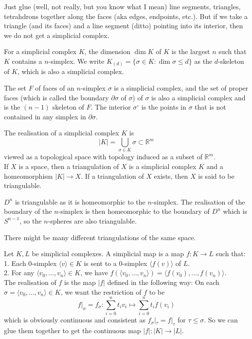 \begin{example}
    Just glue (well, not really, but you know what I mean) line segments, triangles, tetrahdrons together along the faces (aka edges, endpoints, etc.).
    But if we take a triangle (and its faces) and a line segment (ditto) pointing into its interior, then we do not get a simplicial complex.
\end{example}
\begin{definition}
    For a simplicial complex $K$, the dimension $\dim K$ of $K$ is the largest $n$ such that $K$ contains a $n$-simplex.
    We write $K_{(d)}=\{\sigma\in K:\dim\sigma\le d\}$ as the $d$-skeleton of $K$, which is also a simplicial complex.
\end{definition}
\begin{example}
    The set $F$ of faces of an $n$-simplex $\sigma$ is a simplicial complex, and the set of proper faces (which is called the boundary $\partial\sigma$ of $\sigma$) of $\sigma$ is also a simplicial complex and is the $(n-1)$ skeleton of $F$.
    The interior $\sigma^\circ$ is the points in $\sigma$ that is not contained in any simplex in $\partial\sigma$.
\end{example}
\begin{definition}
    The realisation of a simplicial complex $K$ is
    $$|K|=\bigcup_{\sigma\in K}\sigma\subset\mathbb R^m$$
    viewed as a topological space with topology induced as a subset of $\mathbb R^m$.\\
    If $X$ is a space, then a triangulation of $X$ is a simplicial complex $K$ and a homeomorphism $|K|\to X$.
    If a triangulation of $X$ exists, then $X$ is said to be triangulable.
\end{definition}
\begin{example}
    $D^n$ is triangulable as it is homeomorphic to the $n$-simplex.
    The realisation of the boundary of the $n$-simplex is then homeomorphic to the boundary of $D^n$ which is $S^{n-1}$, so the $n$-spheres are also triangulable.
\end{example}
\begin{remark}
    There might be many different triangulations of the same space.
\end{remark}
\begin{definition}
    Let $K,L$ be simplicial complexes.
    A simplicial map is a map $f:K\to L$ such that:
    1. Each $0$-simplex $\langle v\rangle\in K$ is sent to a $0$-simplex $\langle f(v)\rangle$ of $L$.\\
    2. For any $\langle v_0,\ldots,v_n\rangle\in K$, we have $f(\langle v_0,\ldots,v_n\rangle)=\langle f(v_0),\ldots,f(v_n)\rangle$.\\
    The realisation of $f$ is the map $|f|$ defined in the following way:
    On each $\sigma=\langle v_0,\ldots,v_n\rangle\in K$, we want the restriction of $f$ to be
    $$f|_\sigma=f_\sigma:\sum_{i=0}^nt_iv_i\mapsto\sum_{i=0}^nt_if(v_i)$$
    which is obviously continuous and consistent as $f_\sigma|_\tau=f|_\tau$ for $\tau\le\sigma$.
    So we can glue them together to get the continuous map $|f|:|K|\to |L|$.
\end{definition}
